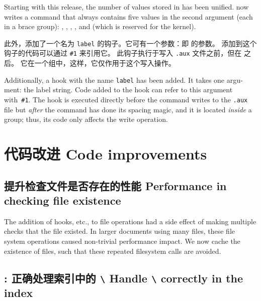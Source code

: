 \documentclass{ltnews}
\begin{document}
\begin{english}
Starting with this release, the number of values stored in  has been unified. 
 now writes a
 command that always contains five values in the second argument (each in a brace group):
, , , 
, and  (which is reserved for the kernel).
\end{english}

此外，添加了一个名为 \texttt{label} 的钩子。它可有一个参数：即  的参数。
添加到这个钩子的代码可以通过 \verb+#1+ 来引用它。
此钩子执行于写入 \texttt{.aux} 文件之前，但在  之后。
它在一个组中，这样，它仅作用于这个写入操作。

\begin{english}
Additionally, a hook with the name \texttt{label} has been 
added. It takes one argument: the label string.
Code added to the hook can refer to this argument with~\verb+#1+. 
The hook is executed directly before the  command writes to the \texttt{.aux} file
but \emph{after} the  command has done its spacing magic, and it is located \emph{inside} a group; thus, its code only affects the write operation. 
\end{english}

\section{代码改进 Code improvements}

\subsection{提升检查文件是否存在的性能 Performance in checking file existence}

The addition of hooks, etc., to file operations had a side effect of making
multiple checks that the file existed. In larger documents using
many files, these file system operations caused non-trivial performance
impact. We now cache the existence of files, such that these repeated filesystem
calls are avoided.

\subsection{: 正确处理索引中的 \texttt{\textbackslash\textvisiblespace} 
  Handle \texttt{\textbackslash\textvisiblespace} correctly in the index}
\end{document}
